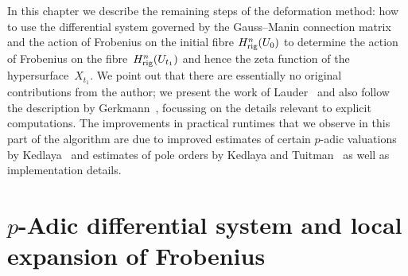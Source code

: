 
In this chapter we describe the remaining steps of the deformation method:  
how to use the differential system governed by the Gauss--Manin connection 
matrix and the action of Frobenius on the initial fibre $H_{\text{rig}}^{n}(U_0)$ 
to determine the action of Frobenius on the fibre~$H_{\text{rig}}^{n}(U_{t_1})$ 
and hence the zeta function of the hypersurface~$X_{t_1}$.
We point out that there are essentially no original contributions from the 
author;  we present the work of Lauder~\citep{Lau04} and also follow the 
description by Gerkmann~\citep{Gerkmann2007}, focussing on the details 
relevant to explicit computations.  The improvements in practical runtimes 
that we observe in this part of the algorithm are due to improved estimates 
of certain $p$-adic valuations by Kedlaya~\citep{Kedlaya2010} and estimates 
of pole orders by Kedlaya and Tuitman~\citep{KedlayaTuitman2012} as well as 
implementation details.

\section{$p$-Adic differential system and local expansion of Frobenius}

